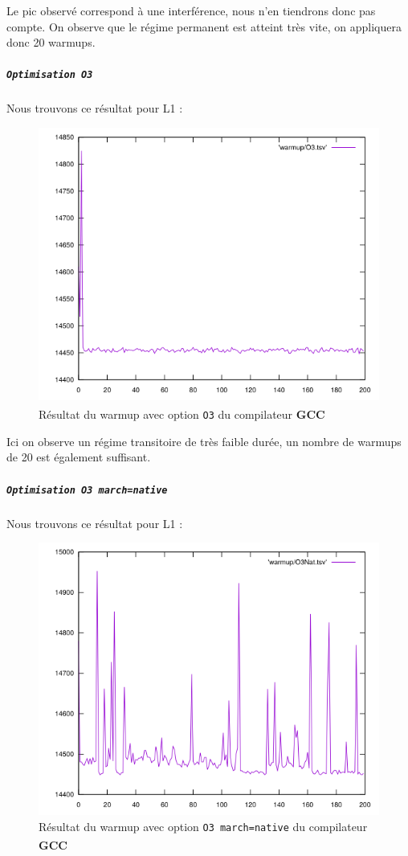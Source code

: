 \documentclass{report}
\begin{document}
      Le pic observé correspond à une interférence, nous n'en tiendrons donc pas compte. On observe que le régime permanent est atteint très vite, on appliquera donc 20 warmups.
      \newpage
      \subparagraph{ \texttt{Optimisation O3}}
    Nous trouvons ce résultat pour L1 :
    \begin{figure}[ht!]
      \centering
      \includegraphics[scale=0.45]{resources/L1/warmup/O3.png}
      \caption{Résultat du warmup avec option \texttt{O3} du compilateur \textbf{GCC\textsuperscript \textcopyleft  }}
    \end{figure}

    Ici on observe un régime transitoire de très faible durée, un nombre de warmups de 20 est également suffisant.
    \newpage
\subparagraph{ \texttt{Optimisation O3 march=native}}
  Nous trouvons ce résultat pour L1 :
  \begin{figure}[ht!]
    \centering
\includegraphics[scale=0.45]{resources/L1/warmup/O3Nat.png}
    \caption{Résultat du warmup avec option \texttt{O3 march=native} du compilateur \textbf{GCC\textsuperscript \textcopyleft  }}
  \end{figure}
\end{document}
